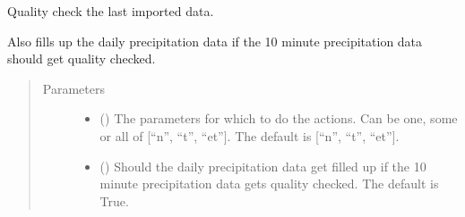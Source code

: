 \documentclass[letterpaper,10pt,english]{sphinxmanual}
\begin{document}
\begin{fulllineitems}
\begin{fulllineitems}
\begin{quote}
\begin{description}
\end{description}\end{quote}

\end{fulllineitems}


\begin{fulllineitems}
\label{\detokenize{weatherDB:weatherDB.broker.Broker.last_imp_quality_check}}
\sphinxAtStartPar
Quality check the last imported data.

\sphinxAtStartPar
Also fills up the daily precipitation data if the 10 minute precipitation data should get quality checked.
\begin{quote}\begin{description}
\item[{Parameters}] \leavevmode\begin{itemize}
\item {} 
\sphinxAtStartPar
{} (\sphinxstyleliteralemphasis{\sphinxupquote{, }}) \textendash{} The parameters for which to do the actions.
Can be one, some or all of {[}“n”, “t”, “et”{]}.
The default is {[}“n”, “t”, “et”{]}.

\item {} 
\sphinxAtStartPar
{} (\sphinxstyleliteralemphasis{\sphinxupquote{, }}) \textendash{} Should the daily precipitation data get filled up if the 10 minute precipitation data gets quality checked.
The default is True.

\end{itemize}

\end{description}\end{quote}

\end{fulllineitems}


\end{fulllineitems}
\end{document}
